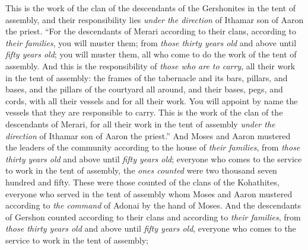 \begin{biblechapter}
\verse This is the work of the clan of the descendants of the Gershonites in the tent of assembly, and their responsibility lies \textit{under the direction} of Ithamar son of Aaron the priest.
\verse “For the descendants of Merari according to their clans, according to \textit{their families}, you will muster them;
\verse from \textit{those thirty years old} and above until \textit{fifty years old}; you will muster them, all who come to do the work of the tent of assembly.
\verse And this is the responsibility of \textit{those who are to carry}, all their work in the tent of assembly: the frames of the tabernacle and its bars, pillars, and bases,
\verse and the pillars of the courtyard all around, and their bases, pegs, and cords, with all their vessels and for all their work. You will appoint by name the vessels that they are responsible to carry.
\verse This is the work of the clan of the descendants of Merari, for all their work in the tent of assembly \textit{under the direction} of Ithamar son of Aaron the priest.”
\verse And Moses and Aaron mustered the leaders of the community according to the house of \textit{their families},
\verse from \textit{those thirty years old} and above until \textit{fifty years old}; everyone who comes to the service to work in the tent of assembly,
\verse the \textit{ones counted} were two thousand seven hundred and fifty.
\verse These were those counted of the clans of the Kohathites, everyone who served in the tent of assembly whom Moses and Aaron mustered according to \textit{the command} of Adonai by the hand of Moses.
\verse And the descendants of Gershon counted according to their clans and according to \textit{their families},
\verse from \textit{those thirty years old} and above until \textit{fifty years old}, everyone who comes to the service to work in the tent of assembly;

\end{biblechapter}

